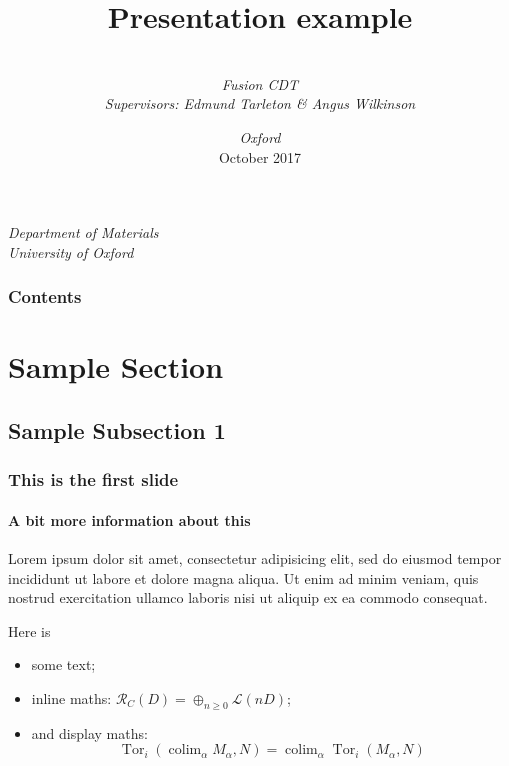 


\title[Presentation]
	{%
		Presentation example
	} %
\author%
	{%
		\\
		\textit{Fusion CDT}\\
		\textit{Supervisors: Edmund Tarleton \& Angus Wilkinson}
	}
\institute%
	{%
		\textit{Department of Materials}\\
		\textit{University of Oxford}
	}
\date[DCG]%
	{%
		\textit{Oxford}\\
		October 2017
	}


\begin{frame}[plain]
	\titlepage
\end{frame}
%
\begin{frame}
	\frametitle{Contents}
	\framesubtitle{\inserttitle}
	\tableofcontents
\end{frame}
%
\section{Sample Section}
\subsection{Sample Subsection 1}
\begin{frame}
	\frametitle{This is the first slide}
	\framesubtitle{A bit more information about this}

	Lorem ipsum dolor sit amet, consectetur adipisicing elit, sed do eiusmod
	tempor incididunt ut labore et dolore magna aliqua. Ut enim ad minim veniam,
	quis nostrud exercitation ullamco laboris nisi ut aliquip ex ea commodo
	consequat.

	Here is
	\the\paperwidth
	\begin{itemize}
		\item some text;
		\item inline maths: $\mathcal{R}_C(D)=\oplus_{n\geqslant0}\mathcal{L}(nD)$;
		\item and display maths:
		      \[
			      \operatorname{Tor}_i(\operatorname{colim}_\alpha M_\alpha, N)
			      = \operatorname{colim}_\alpha\operatorname{Tor}_i(M_\alpha,N)
		      \]
	\end{itemize}

\end{frame}


